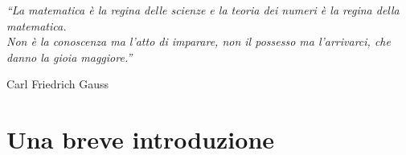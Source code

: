 \documentclass[a4paper,twoside]{book}
\begin{document}
	\frontmatter
	\setcounter{page}{1}
	\author{}
	\title{}
	\maketitle
	
	\tableofcontents
	\newpage
	\epigraph{\textit{\enquote{La matematica è la regina delle scienze e la teoria dei numeri è la regina della matematica. \\ Non è la conoscenza ma l'atto di imparare, non il possesso ma l'arrivarci, che danno la gioia maggiore.}}}{Carl Friedrich Gauss}
	
	\chapter{Una breve introduzione}
\end{document}
